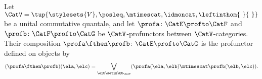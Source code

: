 \begin{ctdefinition}
\label{def:enriched-profunctor-composition-monoidal-poset}
Let $\CatV = \tup{\stylesets{V}, \posleq, \mtimescat, \idmoncat, \leftinthom{\ }{\ }}$ be a unital commutative quantale, and let $\profa \colon \CatE \profto \CatF$ and $\profb \colon \CatF \profto \CatG$ be $\CatV$-profunctors between $\CatV$-categories. Their composition $\profa \fthen \profb \colon \CatE \profto \CatG$ is the profunctor defined on objects by
\begin{equation}
(\profa \fthen \profb)(\ela, \elc) = \bigvee_{\elb \setin \Ob_\CatF} (\profa (\ela, \elb) \mtimescat \profb (\elb, \elc)).
\end{equation}
\end{ctdefinition}





